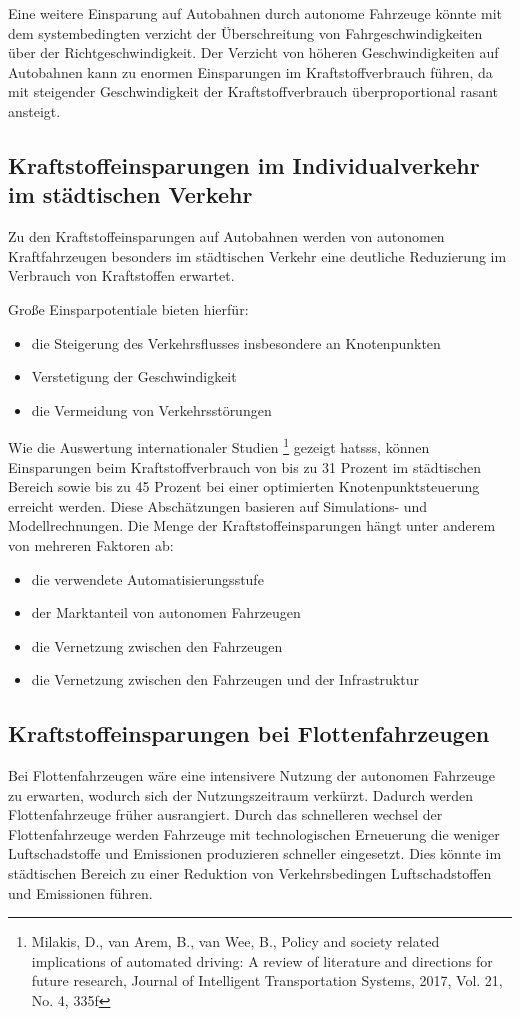 Eine weitere Einsparung auf Autobahnen durch autonome Fahrzeuge könnte mit
dem systembedingten verzicht der Überschreitung von Fahrgeschwindigkeiten über der Richtgeschwindigkeit.
Der Verzicht von höheren Geschwindigkeiten auf Autobahnen kann zu enormen Einsparungen im Kraftstoffverbrauch führen,
da mit steigender Geschwindigkeit der Kraftstoffverbrauch überproportional rasant ansteigt.

\subsection{Kraftstoffeinsparungen im Individualverkehr im städtischen Verkehr}
Zu den Kraftstoffeinsparungen auf Autobahnen werden von
autonomen Kraftfahrzeugen besonders im städtischen Verkehr
eine deutliche Reduzierung im Verbrauch von Kraftstoffen erwartet.

Große Einsparpotentiale bieten hierfür:
\begin{itemize}
	\item die Steigerung des Verkehrsflusses insbesondere an Knotenpunkten
	\item Verstetigung der Geschwindigkeit
	\item die Vermeidung von Verkehrsstörungen
\end{itemize}

Wie die Auswertung internationaler Studien
\footnote{Milakis, D., van Arem, B., van Wee, B., Policy and society related implications of
	automated driving: A review of literature and directions for future research, Journal of
	Intelligent Transportation Systems, 2017, Vol. 21, No. 4, 335f} gezeigt hatsss,
können Einsparungen beim Kraftstoffverbrauch von
bis zu 31 Prozent im städtischen Bereich sowie
bis zu 45 Prozent bei einer optimierten Knotenpunktsteuerung erreicht werden.
Diese Abschätzungen basieren auf Simulations- und Modellrechnungen.
Die Menge der  Kraftstoffeinsparungen hängt unter anderem von mehreren Faktoren ab:
\begin{itemize}
	\item die verwendete Automatisierungsstufe
	\item der Marktanteil von autonomen Fahrzeugen
	\item die Vernetzung zwischen den Fahrzeugen
	\item die Vernetzung zwischen den Fahrzeugen und der Infrastruktur
\end{itemize}

\subsection{Kraftstoffeinsparungen bei Flottenfahrzeugen}
Bei Flottenfahrzeugen wäre eine intensivere Nutzung der autonomen Fahrzeuge zu erwarten, wodurch sich der Nutzungszeitraum verkürzt.
Dadurch werden Flottenfahrzeuge früher ausrangiert.
Durch das schnelleren wechsel der Flottenfahrzeuge werden Fahrzeuge mit technologischen Erneuerung
die weniger Luftschadstoffe und Emissionen produzieren schneller eingesetzt.
Dies könnte im städtischen Bereich zu einer Reduktion von Verkehrsbedingen Luftschadstoffen und Emissionen führen.

